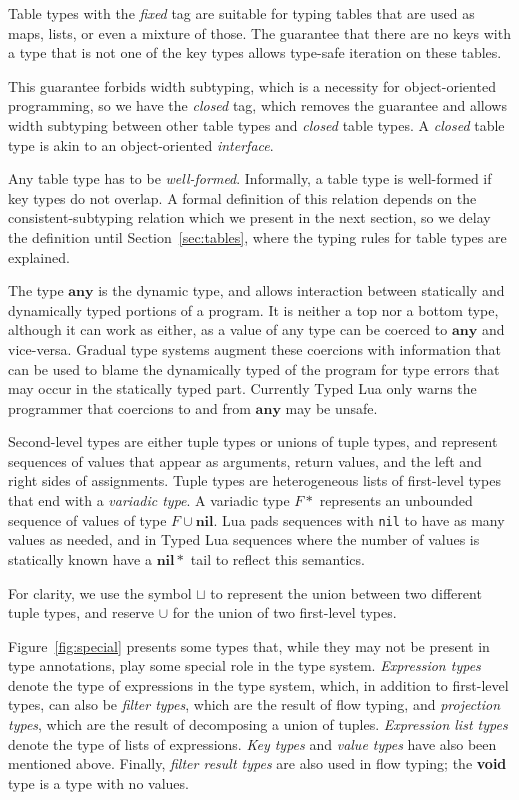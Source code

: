 \documentclass[10pt]{sigplanconf}
\newcommand{\Any}{\mathbf{any}}
\newcommand{\Nil}{\mathbf{nil}}
\begin{document}
Table types with the {\em fixed} tag are suitable for typing tables that are used as maps, lists, or even a mixture of those. The guarantee that there are no keys with a type that is not
one of the key types allows type-safe iteration on these
tables.

This guarantee forbids width subtyping, which is a necessity
for object-oriented programming, so we have the {\em closed}
tag, which removes the guarantee and allows width subtyping
between other table types and {\em closed} table types. A {\em closed} table type is akin to an object-oriented {\em interface}.

Any table type has to be \emph{well-formed}.
Informally, a table type is well-formed if key types do not overlap. A formal definition of this relation depends on
the consistent-subtyping relation which we present in the
next section, so we delay the definition until Section~\ref{sec:tables}, where the typing rules for
table types are explained.

The type $\Any$ is the dynamic type, and allows
interaction between statically and dynamically typed
portions of a program. It is neither a top nor a bottom
type, although it can work as either, as a value of
any type can be coerced to $\Any$ and vice-versa.
Gradual type systems augment these coercions with
information that can be used to blame the dynamically
typed of the program for type errors that may occur in the
statically typed part. Currently Typed Lua only 
warns the programmer that coercions to and from $\Any$
may be unsafe.

Second-level types are either tuple types or unions of tuple types, and represent sequences of values that appear as arguments, return values, and the left and right sides of
assignments. Tuple types are heterogeneous lists of first-level
types that end with a {\em variadic type}.
A variadic type $F{*}$ represents an unbounded sequence of values of type $F \cup \Nil$. Lua pads sequences with {\tt nil} to
have as many values as needed, and in Typed Lua sequences
where the number of values is statically known have a $\Nil{*}$
tail to reflect this semantics.

For clarity, we use the symbol $\sqcup$ to represent the union between two different tuple types, and reserve $\cup$ for the
union of two first-level types.

Figure~\ref{fig:special} presents some types that, while
they may not be present in type annotations, play some
special role in the type system. {\em Expression types}
denote the type of expressions in the type system, which,
in addition to first-level types, can also be
{\em filter types}, which are the result of flow typing,
and {\em projection types}, which are the result of
decomposing a union of tuples. {\em Expression list types}
denote the type of lists of expressions. {\em Key types}
and {\em value types} have also been mentioned above. Finally, {\em filter result types}
are also used in flow typing; the {\bf void} type is
a type with no values.
\end{document}
